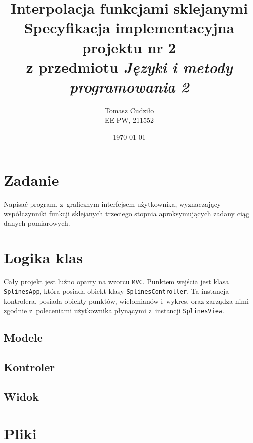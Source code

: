 \documentclass[10pt,a4paper]{article}
\newcommand{\ft}[1]{\texttt{#1}}
\begin{document}
\title{ 
  Interpolacja funkcjami sklejanymi\\
  {\normalsize Specyfikacja implementacyjna projektu nr 2}\\\vspace{-12pt}
  {\normalsize z przedmiotu \emph{Języki i metody programowania 2}}
}
\author{
  Tomasz Cudziło\\
  {\small EE PW, 211552}
}
\date{\today}
\maketitle

\section*{Zadanie}
\label{sec:zadanie}

Napisać program, z~graficznym interfejsem użytkownika, wyznaczający
współczynniki funkcji sklejanych trzeciego stopnia aproksymujących zadany ciąg
danych pomiarowych.

\vspace{20pt}

\section{Logika klas}

Cały projekt jest luźno oparty na wzorcu \ft{MVC}. Punktem wejścia jest klasa
\ft{SplinesApp}, która posiada obiekt klasy \ft{SplinesController}. Ta
instancja kontrolera, posiada obiekty punktów, wielomianów i~wykres, oraz
zarządza nimi zgodnie z~poleceniami użytkownika płynącymi z~instancji
\ft{SplinesView}.

\subsection{Modele}

\subsection{Kontroler}

\subsection{Widok}

\section{Pliki}
\end{document}
